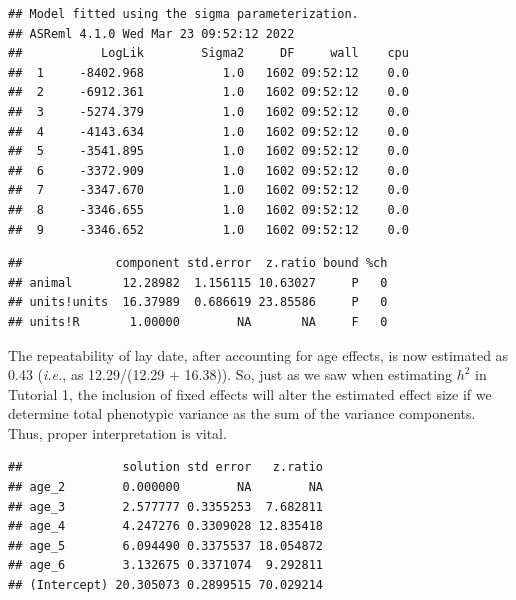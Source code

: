 \documentclass[
  12pt,
]{book}
\newenvironment{Shaded}{\begin{snugshade}}{\end{snugshade}}
\newcommand{\DataTypeTok}[1]{\textcolor[rgb]{0.13,0.29,0.53}{#1}}
\newcommand{\KeywordTok}[1]{\textcolor[rgb]{0.13,0.29,0.53}{\textbf{#1}}}
\newcommand{\NormalTok}[1]{#1}
\newcommand{\OperatorTok}[1]{\textcolor[rgb]{0.81,0.36,0.00}{\textbf{#1}}}
\newcommand{\OtherTok}[1]{\textcolor[rgb]{0.56,0.35,0.01}{#1}}
\newcommand{\StringTok}[1]{\textcolor[rgb]{0.31,0.60,0.02}{#1}}
\begin{document}
\begin{verbatim}
## Model fitted using the sigma parameterization.
## ASReml 4.1.0 Wed Mar 23 09:52:12 2022
##           LogLik        Sigma2     DF     wall    cpu
##  1     -8402.968           1.0   1602 09:52:12    0.0
##  2     -6912.361           1.0   1602 09:52:12    0.0
##  3     -5274.379           1.0   1602 09:52:12    0.0
##  4     -4143.634           1.0   1602 09:52:12    0.0
##  5     -3541.895           1.0   1602 09:52:12    0.0
##  6     -3372.909           1.0   1602 09:52:12    0.0
##  7     -3347.670           1.0   1602 09:52:12    0.0
##  8     -3346.655           1.0   1602 09:52:12    0.0
##  9     -3346.652           1.0   1602 09:52:12    0.0
\end{verbatim}

\begin{Shaded}
\end{Shaded}

\begin{verbatim}
##             component std.error  z.ratio bound %ch
## animal       12.28982  1.156115 10.63027     P   0
## units!units  16.37989  0.686619 23.85586     P   0
## units!R       1.00000        NA       NA     F   0
\end{verbatim}

The repeatability of lay date, after accounting for age effects, is now estimated as 0.43 (\emph{i.e.}, as 12.29/(12.29 + 16.38)).
So, just as we saw when estimating \(h^2\) in Tutorial 1, the inclusion of fixed effects will alter the estimated effect size if we determine total phenotypic variance as the sum of the variance components. Thus, proper interpretation is vital.

\begin{Shaded}
\end{Shaded}

\begin{verbatim}
##              solution std error   z.ratio
## age_2        0.000000        NA        NA
## age_3        2.577777 0.3355253  7.682811
## age_4        4.247276 0.3309028 12.835418
## age_5        6.094490 0.3375537 18.054872
## age_6        3.132675 0.3371074  9.292811
## (Intercept) 20.305073 0.2899515 70.029214
\end{verbatim}
\end{document}
